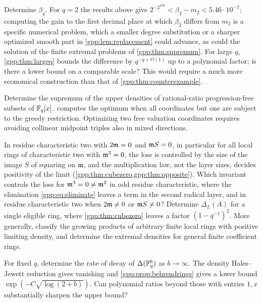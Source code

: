 \begin{question}\label{gpp:q:beta}
Determine $\beta_q$. For $q=2$ the results above give
$2^{-2^{476}}<\beta_2-m_2<5.46\cdot10^{-7}$; computing the gain to the first decimal
place at which $\beta_2$ differs from $m_2$ is a specific numerical problem, which a
smaller degree substitution or a sharper optimized smooth part in
\cref{gpp:lem:replacement} could advance, as could the solution of the finite extremal
problems of \cref{gpp:thm:supremum}. For large $q$, \cref{gpp:thm:largeq} bounds the
difference by $q^{-q+O(1)}$ up to a polynomial factor; is there a lower bound on a
comparable scale? This would require a much more economical construction than that of
\cref{gpp:thm:counterexample}.
\end{question}

\begin{question}\label{gpp:q:rational}
Determine the supremum of the upper densities of rational-ratio progression-free subsets
of $\mathbb{F}_q[x]$.  computes the optimum when all coordinates but one
are subject to the greedy restriction. Optimizing two free valuation coordinates
requires avoiding collinear midpoint triples also in mixed directions.
\end{question}

\begin{question}\label{gpp:q:cube}
In residue characteristic two with $2\mathfrak{m}=0$ and $\mathfrak{m} S=0$, in particular for all local
rings of characteristic two with $\mathfrak{m}^3=0$, the loss is controlled by the size of the image
$S$ of squaring on $\mathfrak{m}$, and the multiplication law, not the layer sizes, decides
positivity of the limit (\cref{gpp:thm:cubezero,gpp:thm:opposite}). Which invariant
controls the loss for $\mathfrak{m}^3=0\ne\mathfrak{m}^2$ in odd residue characteristic, where the
elimination \eqref{gpp:eq:eliminate} leaves a term in the second radical layer, and in
residue characteristic two when $2\mathfrak{m}\ne0$ or $\mathfrak{m} S\ne0$? Determine $\Delta_L(A)$ for
a single eligible ring, where \cref{gpp:thm:cubezero} leaves a factor $(1-q^{-1})^2$. More
generally, classify the growing products of arbitrary finite local rings with positive
limiting density, and determine the extremal densities for general finite coefficient
rings.
\end{question}

\begin{question}\label{gpp:q:decay}
For fixed $q$, determine the rate of decay of $\Delta(\mathbb{F}_q^b)$ as $b\to\infty$. The
density Hales--Jewett reduction gives vanishing and \cref{gpp:prop:behrendrings} gives a
lower bound $\exp(-C\sqrt{\log(2+b)})$. Can polynomial ratios beyond those with entries
$1,x$ substantially sharpen the upper bound?
\end{question}

